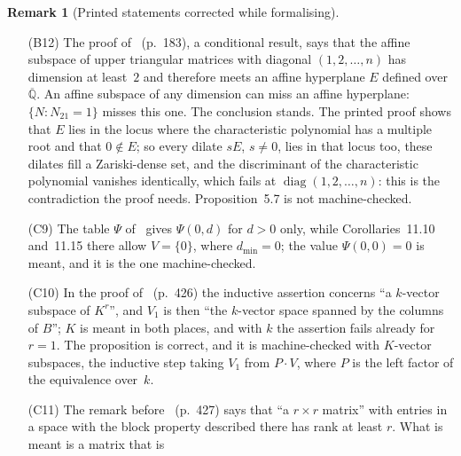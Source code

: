 \documentclass[11pt,a4paper]{article}
\theoremstyle{plain}
\theoremstyle{definition}
\newtheorem{remark}[theorem]{Remark}
\newcommand{\Q}{\mathbb{Q}}
\newcommand{\Alg}{\overline{\mathbb{Q}}}
\begin{document}
\begin{remark}[Printed statements corrected while formalising]
\begin{itemize}
$p,q\in\Q^{2}$ with $2p_{1}^{2}=p_{2}^{2}$. The remark is right: the isomorphism $X\mapsto1$ and a dehomogenisation,
as in~(B7), carry the property in the case it treats. It is machine-checked by another route, for every field $k$
and without the hypothesis $E_{0}\cap k=\{0\}$, which follows from the algebraic independence: the inductive proof of
Proposition~12.2 (pp.~420--422) is run on $k+E_{0}$ directly, with the hyperplane $E_{1}$ of its induction chosen to
contain~$1$. The printed step ``$x\notin E_{1}$, hence $x$ is transcendental over $k(E_{1})$'' (Lemma~12.3) fails for
$k+E_{0}$ whenever $1$ lies in the span of the entries but not in $E_{1}$.
\item[(B12)] The proof of~\cite[Proposition~5.7]{fischler-2001} (p.~183), a conditional result, says that the affine
subspace of upper triangular matrices with diagonal $(1,2,\dots,n)$ has dimension at least~$2$ and therefore meets an
affine hyperplane $E$ defined over $\Alg$. An affine subspace of any dimension can miss an affine hyperplane:
$\{N:N_{21}=1\}$ misses this one. The conclusion stands. The printed proof shows that $E$ lies in the locus where the
characteristic polynomial has a multiple root and that $0\notin E$; so every dilate $sE$, $s\neq0$, lies in that
locus too, these dilates fill a Zariski-dense set, and the discriminant of the characteristic polynomial vanishes
identically, which fails at $\operatorname{diag}(1,2,\dots,n)$: this is the contradiction the proof needs.
Proposition~5.7 is not machine-checked.
\item[(C9)] The table $\Psi$ of~\cite[p.~394]{waldschmidt-book} gives $\Psi(0,d)$ for $d>0$ only, while
Corollaries~11.10 and~11.15 there allow $V=\{0\}$, where $d_{\min}=0$; the value $\Psi(0,0)=0$ is meant, and it is
the one machine-checked.
\item[(C10)] In the proof of~\cite[Proposition~12.7]{waldschmidt-book} (p.~426) the inductive assertion concerns ``a
$k$-vector subspace of $K^{r}$'', and $V_{1}$ is then ``the $k$-vector space spanned by the columns of $B$''; $K$ is
meant in both places, and with $k$ the assertion fails already for $r=1$. The proposition is correct, and it is
machine-checked with $K$-vector subspaces, the inductive step taking $V_{1}$ from $P\cdot V$, where $P$ is the left
factor of the equivalence over~$k$.
\item[(C11)] The remark before~\cite[Lemma~12.9]{waldschmidt-book} (p.~427) says that ``a $r\times r$ matrix'' with
entries in a space with the block property described there has rank at least $r$. What is meant is a matrix that is

\end{itemize}
\end{remark}
\end{document}
